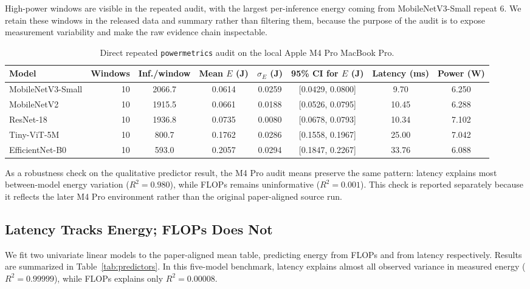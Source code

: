 \documentclass[conference]{IEEEtran}
\begin{document}
High-power windows are visible in the repeated audit, with the largest
per-inference energy coming from MobileNetV3-Small repeat 6. We retain these
windows in the released data and summary rather than filtering them, because
the purpose of the audit is to expose measurement variability and make the raw
evidence chain inspectable.

\begin{table}[ht]
\centering
\caption{Direct repeated \texttt{powermetrics} audit on the local Apple M4 Pro MacBook Pro.}
\label{tab:energy-repeat}
\small
\begin{tabular}{l
r
S[table-format=4.1]
S[table-format=1.4]
S[table-format=1.4]
c
S[table-format=3.2]
S[table-format=1.3]}
\toprule
Model & {Windows} & {Inf./window} & {Mean $E$ (J)} & {$\sigma_E$ (J)} & {95\% CI for $E$ (J)} & {Latency (ms)} & {Power (W)} \\
\midrule
MobileNetV3-Small & 10 & 2066.7 & 0.0614 & 0.0259 & [0.0429, 0.0800] & 9.70 & 6.250 \\
MobileNetV2 & 10 & 1915.5 & 0.0661 & 0.0188 & [0.0526, 0.0795] & 10.45 & 6.288 \\
ResNet-18 & 10 & 1936.8 & 0.0735 & 0.0080 & [0.0678, 0.0793] & 10.34 & 7.102 \\
Tiny-ViT-5M & 10 & 800.7 & 0.1762 & 0.0286 & [0.1558, 0.1967] & 25.00 & 7.042 \\
EfficientNet-B0 & 10 & 593.0 & 0.2057 & 0.0294 & [0.1847, 0.2267] & 33.76 & 6.088 \\
\bottomrule
\end{tabular}
\end{table}

As a robustness check on the qualitative predictor result, the M4 Pro audit
means preserve the same pattern: latency explains most between-model energy
variation ($R^2 = 0.980$), while FLOPs remains uninformative
($R^2 = 0.001$). This check is reported separately because it reflects the
later M4 Pro environment rather than the original paper-aligned source run.

\subsection{Latency Tracks Energy; FLOPs Does Not}
\label{sec:predictors}
We fit two univariate linear models to the paper-aligned mean table, predicting
energy from FLOPs and from latency respectively. Results are summarized in
Table~\ref{tab:predictors}. In this five-model benchmark, latency explains
almost all observed variance in measured energy ($R^2 = 0.99999$), while FLOPs
explains only $R^2 = 0.00008$.
\end{document}
